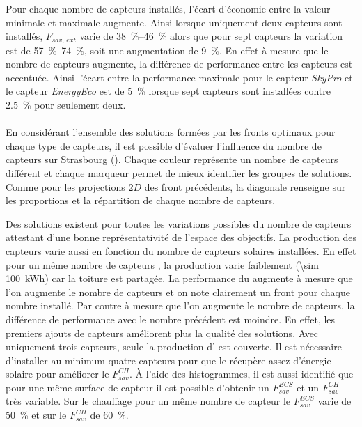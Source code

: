 Pour chaque nombre de capteurs installés, l’écart d’économie entre la valeur minimale et
maximale augmente. Ainsi lorsque uniquement deux capteurs sont installés, $F_{sav,\, ext}$
varie de \SIrange{38}{46}{\percent} alors que pour sept capteurs la variation est de
\SIrange{57}{74}{\percent}, soit une augmentation de \SI{9}{\percent}. En effet à mesure
que le nombre de capteurs augmente, la différence de performance entre les capteurs est
accentuée. Ainsi l’écart entre la performance maximale pour le capteur \textit{SkyPro} et
le capteur \textit{EnergyEco} est de \SI{5}{\percent} lorsque sept capteurs sont installées
contre \SI{2.5}{\percent} pour seulement deux.


\paragraph{} %
En considérant l’ensemble des solutions formées par les fronts optimaux pour chaque
type de capteurs, il est possible d’évaluer l’influence du nombre de capteurs
sur Strasbourg (). Chaque couleur représente un
nombre de capteurs différent et chaque marqueur permet de mieux identifier les
groupes de solutions. Comme pour les projections $2D$ des front précédents, la diagonale
renseigne sur les proportions et la répartition de chaque nombre de capteurs.

Des solutions existent pour toutes les variations possibles du nombre de capteurs
attestant d’une bonne représentativité de l’espace des objectifs. La production des
capteurs  varie aussi en fonction du nombre de capteurs solaires installées.
En effet pour un même nombre de capteurs , la production
varie faiblement (\SI{\sim 100}{kWh}) car la toiture est partagée. La performance du
 augmente à mesure que l’on augmente le nombre de capteurs et on note clairement
un front pour chaque nombre installé. Par contre à mesure que l’on augmente le nombre de
capteurs, la différence de performance avec le nombre précédent est moindre. En effet, les
premiers ajouts de capteurs améliorent plus la qualité des solutions. Avec uniquement trois
capteurs, seule la production d’ est couverte. Il est nécessaire d’installer au
minimum quatre capteurs pour que le  récupère assez d’énergie solaire pour améliorer le
$F_{sav}^{CH}$. À l’aide des histogrammes, il est aussi identifié que pour une même
surface de capteur il est possible d’obtenir un $F_{sav}^{ECS}$ et un $F_{sav}^{CH}$ très
variable. Sur le chauffage pour un même nombre de capteur le $F_{sav}^{ECS}$ varie de
\SI{50}{\percent} et sur le $F_{sav}^{CH}$ de \SI{60}{\percent}.

